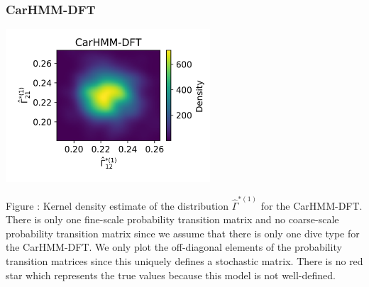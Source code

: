 \documentclass{article}
\begin{document}
        \newpage
        \subsubsection{CarHMM-DFT}
        \begin{center}
        \includegraphics[width=3in]{../Plots/hmm_FV_Gamma_density_0.png}
        \end{center}
        
        \noindent Figure : Kernel density estimate of the distribution $\hat \Gamma^{*(1)}$ for the CarHMM-DFT. There is only one fine-scale probability transition matrix and no coarse-scale probability transition matrix since we assume that there is only one dive type for the CarHMM-DFT. We only plot the off-diagonal elements of the probability transition matrices since this uniquely defines a stochastic matrix. There is no red star which represents the true values because this model is not well-defined.
        \addtocounter{fignum}{1}
\end{document}
